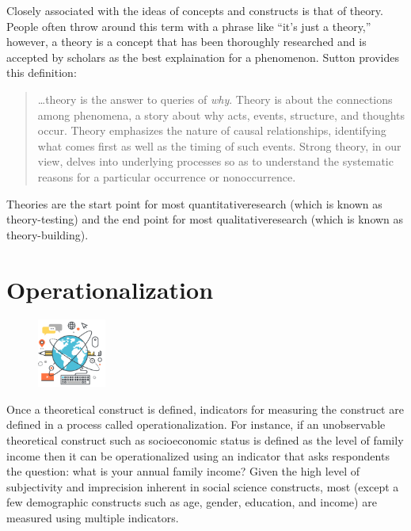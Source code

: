 Closely associated with the ideas of concepts and constructs is that of \gls{theory}. People often throw around this term with a phrase like ``it's just a theory,'' however, a theory is a concept that has been thoroughly researched and is accepted by scholars as the best explaination for a phenomenon. Sutton provides this definition: 

\begin{quote}
	\ldots theory is the answer to queries of \textit{why}. Theory is about the connections among phenomena, a story about why acts, events, structure, and thoughts occur. Theory emphasizes the nature of causal relationships, identifying what comes first as well as the timing of such events. Strong theory, in our view, delves into underlying processes so as to understand the systematic reasons for a particular occurrence or nonoccurrence.\cite{sutton1995theory}
\end{quote}

Theories are the start point for most \gls{quantitativeresearch} (which is known as theory-testing) and the end point for most \gls{qualitativeresearch} (which is known as theory-building).

\section{Operationalization}

\begin{figure}
	\caption*{} %
	\label{} 
	\centering
	\includegraphics[width=0.2\textwidth]{gfx/05-operation} 
\end{figure}

Once a theoretical construct is defined, indicators for measuring the construct are defined in a process called operationalization. For instance, if an unobservable theoretical construct such as socioeconomic status is defined as the level of family income then it can be operationalized using an indicator that asks respondents the question: what is your annual family income? Given the high level of subjectivity and imprecision inherent in social science constructs, most (except a few demographic constructs such as age, gender, education, and income) are measured using multiple indicators.

